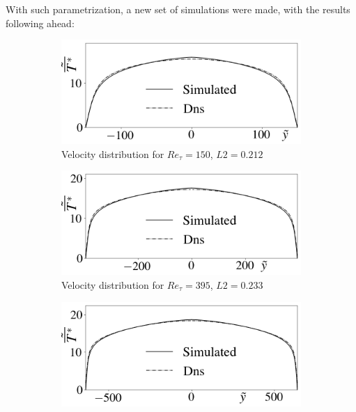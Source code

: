 \documentclass[10pt]{article} %
\begin{document}
With such parametrization, a new set of simulations were made, with the results following ahead:

\begin{figure}[!h]
	\centering
	\begin{subfigure}[t]{0.5\textwidth}
		\centering
		\includegraphics[angle=0, scale=0.24]{fotos_formatacao_final/Temperature_150_071_Prt(Ret)_Avelocity}
		\caption{Velocity distribution for $Re_\tau = 150$, $L2 = 0.212$}
	\end{subfigure}
	\begin{subfigure}[t]{0.45\textwidth}
		\centering
		\includegraphics[angle=0, scale=0.24]{fotos_formatacao_final/Temperature_395_071_Prt(Ret)_Avelocity}
		\caption{Velocity distribution for $Re_\tau = 395$, $L2 = 0.233$}
	\end{subfigure}
	\begin{subfigure}[t]{0.5\textwidth}
		\centering
		\includegraphics[angle=0, scale=0.24]{fotos_formatacao_final/Temperature_640_071_Prt(Ret)_Avelocity}

\end{subfigure}
\end{figure}
\end{document}
